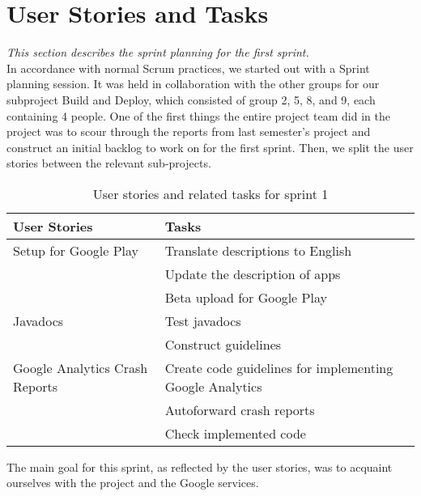 \section{User Stories and Tasks} \label{Sprint1_SecUserStoriesAndTasks}
\textit{This section describes the sprint planning for the first sprint.}\\
In accordance with normal Scrum practices, we started out with a Sprint planning session. It was held in collaboration with the other groups for our subproject Build and Deploy, which consisted of group 2, 5, 8, and 9, each containing 4 people. One of the first things the entire project team did in the project was to scour through the reports from last semester's project and construct an initial backlog to work on for the first sprint. Then, we split the user stories between the relevant sub-projects.

\begin{table}[H]
	\centering
	\begin{tabular}{ll}
		\textbf{User Stories} & \textbf{Tasks}\\ \hline \noalign{\vskip 2mm}
		Setup for Google Play & Translate descriptions to English\\
		& Update the description of apps\\
		& Beta upload for Google Play\\ \hline
		Javadocs & Test javadocs\\
		& Construct guidelines\\ \hline
		Google Analytics Crash Reports & Create code guidelines for implementing Google Analytics\\
		& Autoforward crash reports\\
		& Check implemented code\\ \hline
	\end{tabular}
	\caption{User stories and related tasks for sprint 1}
	\label{UserStories_table}
\end{table}

The main goal for this sprint, as reflected by the user stories, was to acquaint ourselves with the project and the Google services.